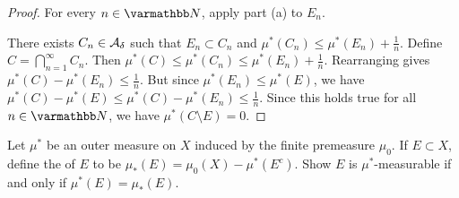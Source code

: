 \begin{proof}
        \noindent For every $n \in \bfN$, apply part (a) to $E_n$. \nl
        
        \noindent There exists $C_n \in \mathcal{A}_\delta$ such that $E_n \subset C_n$ and $\mu^\ast(C_n) \leq \mu^\ast(E_n) + \frac{1}{n}$. Define $C = \bigcap_{n = 1}^\infty C_n$. Then $\mu^\ast(C) \leq \mu^\ast(C_n) \leq \mu^\ast(E_n) + \frac{1}{n}$. Rearranging gives $\mu^\ast(C) - \mu^\ast(E_n) \leq \frac{1}{n}$. But since $\mu^\ast(E_n) \leq \mu^\ast(E)$, we have $\mu^\ast(C) - \mu^\ast(E) \leq \mu^\ast(C) - \mu^\ast(E_n) \leq \frac{1}{n}$. Since this holds true for all $n \in \bfN$, we have $\mu^\ast(C \setminus E) = 0$.
    \end{proof}
\begin{exercise}
    Let $\mu^\ast$ be an outer measure on $X$ induced by the finite premeasure $\mu_0$. If $E \subset X$, define the  of $E$ to be $\mu_\ast(E) = \mu_0(X) - \mu^\ast(E^c)$. Show $E$ is $\mu^\ast$-measurable if and only if $\mu^\ast(E) = \mu_\ast(E)$.
\end{exercise}
